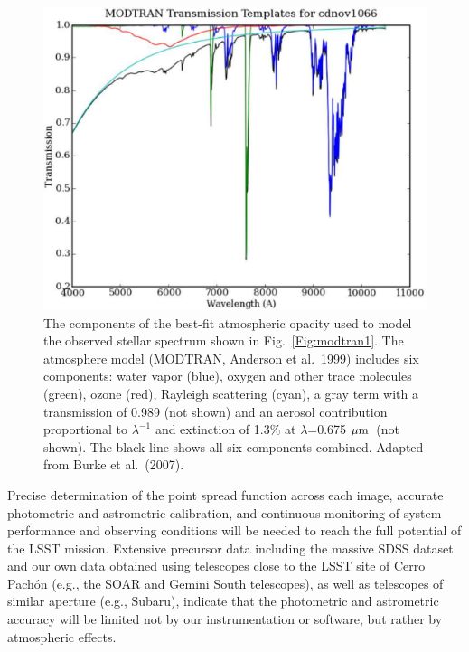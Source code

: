 \documentclass{emulateapj}
\def\mic              {\hbox{$\mu{\rm m}$}}
\begin{document}
\begin{figure}
\includegraphics[width=1.0\hsize,clip]{modtran2.pdf}
\caption{The components of the best-fit atmospheric opacity used to
model the observed stellar spectrum shown in Fig.~\ref{Fig:modtran1}.
The atmosphere model (MODTRAN, Anderson et al.~1999) includes six
components: water vapor (blue), oxygen and other trace molecules
(green), ozone (red), Rayleigh scattering (cyan), a gray term
with a transmission of 0.989 (not shown) and an aerosol contribution
proportional to $\lambda^{-1}$ and extinction of 1.3\% at $\lambda$=0.675 \mic\
(not shown). The black line shows all six components combined.
Adapted from Burke et al.~(2007).}
\label{Fig:modtran2}
\end{figure}


Precise determination of the point spread function across each image, 
accurate photometric and astrometric calibration, and continuous monitoring 
of system performance and observing conditions will be needed to reach the 
full potential of the LSST mission. Extensive precursor data including the 
massive SDSS dataset and our own data obtained using telescopes close to 
the LSST site of Cerro Pach\'{o}n (e.g., the SOAR and Gemini South telescopes), 
as well as telescopes of similar aperture (e.g., Subaru), indicate that the 
photometric and astrometric accuracy will be limited not by our instrumentation 
or software, but rather by atmospheric effects. 
\end{document}

